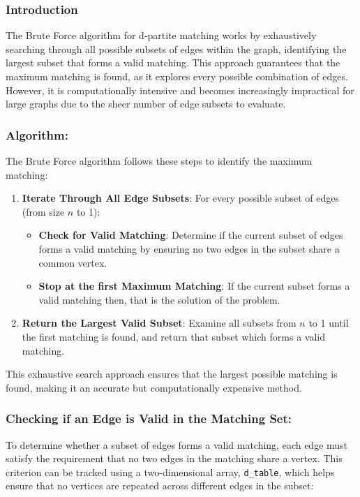 
\subsubsection*{Introduction}
The Brute Force algorithm for d-partite matching works by exhaustively searching through all possible subsets of edges within the graph, identifying the largest subset that forms a valid matching. This approach guarantees that the maximum matching is found, as it explores every possible combination of edges. However, it is computationally intensive and becomes increasingly impractical for large graphs due to the sheer number of edge subsets to evaluate.

\subsubsection*{Algorithm:}
The Brute Force algorithm follows these steps to identify the maximum matching:

\begin{enumerate}

    \item \textbf{Iterate Through All Edge Subsets}: For every possible subset of edges (from size \( n \) to 1):
    \begin{itemize}
        \item \textbf{Check for Valid Matching}: Determine if the current subset of edges forms a valid matching by ensuring no two edges in the subset share a common vertex.
        \item \textbf{Stop at the first Maximum Matching}: If the current subset forms a valid matching then, that is the solution of the problem.
    \end{itemize}
    \item \textbf{Return the Largest Valid Subset}: Examine all subsets from $n$ to 1 until the first matching is found, and return that subset which forms a valid matching.
\end{enumerate}

This exhaustive search approach ensures that the largest possible matching is found, making it an accurate but computationally expensive method.

\subsubsection*{Checking if an Edge is Valid in the Matching Set:}
To determine whether a subset of edges forms a valid matching, each edge must satisfy the requirement that no two edges in the matching share a vertex. This criterion can be tracked using a two-dimensional array, \texttt{d\_table}, which helps ensure that no vertices are repeated across different edges in the subset:

